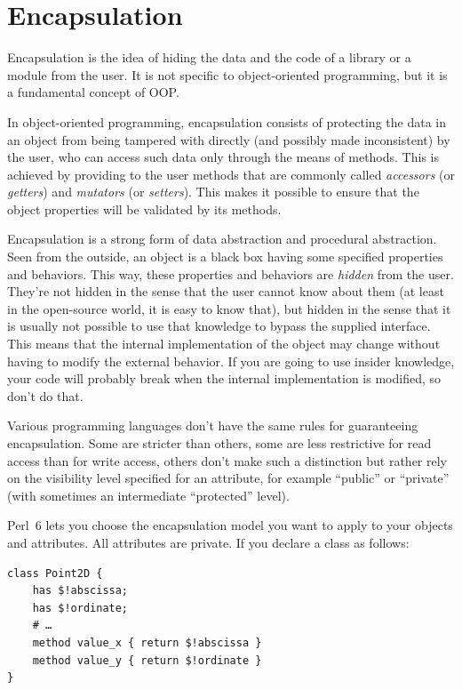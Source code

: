 \section{Encapsulation}

Encapsulation is the idea of hiding the data and the code 
of a library or a module from the user. It is not specific to 
object-oriented programming, but it is a fundamental concept 
of OOP.

In object-oriented programming, encapsulation consists of 
protecting the data in an object from being tampered with 
directly (and possibly made inconsistent) 
by the user, who can access such data only through
the means of methods. This is achieved by providing to the 
user methods that are commonly called \emph{accessors} (or 
\emph{getters}) and \emph{mutators} (or \emph{setters}). This 
makes it possible to ensure that the object properties will 
be validated by its methods.

Encapsulation is a strong form of data abstraction and 
procedural abstraction. Seen from the outside, an object 
is a black box having some specified properties and 
behaviors. This way, these properties and behaviors are 
\emph{hidden} from the user. They're not hidden in the 
sense that the user cannot know about them (at least in 
the open-source world, it is easy to know that), but 
hidden in the sense that it is usually not possible to 
use that knowledge to bypass the supplied interface. This 
means that the internal implementation of the object may 
change without having to modify the external behavior. If you 
are going to use insider knowledge, your code will 
probably break when the internal implementation is 
modified, so don't do that.

Various programming languages don't have the same rules for 
guaranteeing encapsulation. Some are stricter than others, 
some are less restrictive for read access than for write access, 
others don't make such a distinction but rather rely on the 
visibility level specified for an attribute, for example 
``public'' or ``private'' (with sometimes an intermediate 
``protected'' level).

Perl~6 lets you choose the encapsulation model you want to 
apply to your objects and attributes. All attributes are 
private. If you declare a class as follows:

\begin{verbatim}
class Point2D {
    has $!abscissa;
    has $!ordinate;
    # …
    method value_x { return $!abscissa }
    method value_y { return $!ordinate }
}
\end{verbatim}

